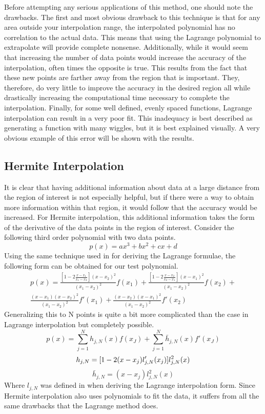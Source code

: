 \documentclass[12pt]{article}
\begin{document}
Before attempting any serious applications of this method, one should note the drawbacks.  The first and most obvious drawback to this technique is that for any area outside your interpolation range, the interpolated polynomial has no correlation to the actual data.  This means that using the Lagrange polynomial to extrapolate will provide complete nonsense.   Additionally, while it would seem that increasing the number of data points would increase the accuracy of the interpolation, often times the opposite is true.  This results from the fact that these new points are farther away from the region that is important.  They, therefore, do very little to improve the accuracy in the desired region all while drastically increasing the computational time necessary to complete the interpolation.  Finally, for some well defined, evenly spaced functions, Lagrange interpolation can result in a very poor fit.  This inadequacy is best described as generating a function with many wiggles, but it is best explained visually.  A very obvious example of this error will be shown with the results.
\subsection{Hermite Interpolation}
It is clear that having additional information about data at a large distance from the region of interest is not especially helpful, but if there were a way to obtain more information within that region, it would follow that the accuracy would be increased.  For Hermite interpolation, this additional information takes the form of the derivative of the data points in the region of interest.  Consider the following third order polynomial with two data points.
\begin{equation}
\label{HermiteP}
p(x) =ax^3+bx^2+cx+d
\end{equation}
Using the same technique used in for deriving the Lagrange formulae, the following form can be obtained for our test polynomial.
\begin{eqnarray}
\label{P2term}
p(x) = \frac{[1-2\frac{x-x_1}{x_1-x_2}](x-x_2)^2}{(x_1-x_2)^2}f(x_1) + \frac{[1-2\frac{x-x_2}{x_2-x_1}](x-x_1)^2}{(x_1-x_2)^2}f(x_2) + \nonumber \\
\frac{(x-x_1)(x-x_2)^2}{(x_1-x_2)^2}f'(x_1)+\frac{(x-x_2)(x-x_1)^2}{(x_1-x_2)^2}f'(x_2)
\end{eqnarray}
Generalizing this to N points is quite a bit more complicated than the case in Lagrange interpolation but completely possible.
\begin{equation}
\label{PNtermHerm}
p(x) = \sum_{j=1}^N h_{j,N}(x)f(x_J)+\sum_{j=1}^N \bar{h}_{j,N}(x)f'(x_J)
\end{equation}
\begin{equation}
\label{HJN}
h_{j,N} = [1-2(x-x_j)l'_{j,N}(x_j)]l^2_{j,N}(x)\\
\end{equation}
\begin{equation}
\label{H_JN}
\bar{h}_{j,N} = (x-x_j)l^2_{j,N}(x)
\end{equation}
Where $l_{j,N}$ was defined in when deriving the Lagrange interpolation form.  Since Hermite interpolation also uses polynomials to fit the data, it suffers from all the same drawbacks that the Lagrange method does.
\end{document}

